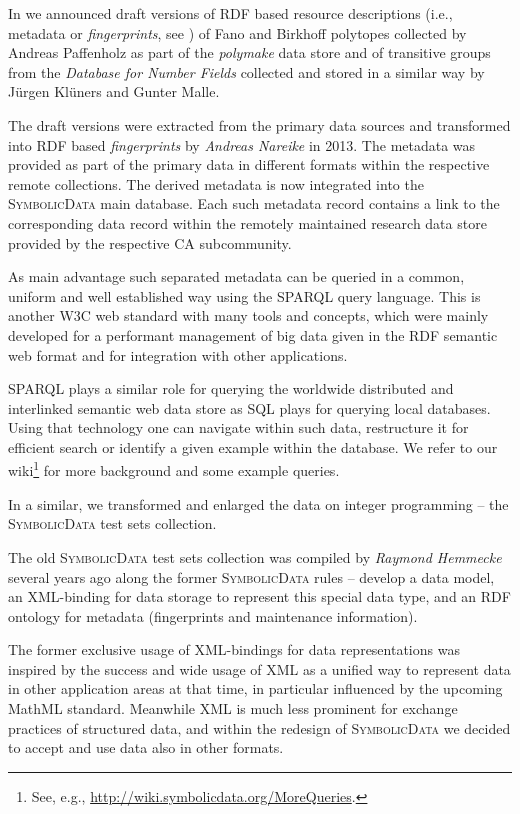 \documentclass[a4paper,11pt]{article}
\def\SD{\textsc{Symbolic\-Data}}
\begin{document}
\begin{multicols}{2}

In \cite{cicm-14} we announced draft versions of RDF based resource
descriptions (i.e., metadata or \emph{fingerprints}, see \cite{icms-16}) of
Fano and Birkhoff polytopes collected by Andreas Paffenholz as part of the
\emph{polymake} data store and of transitive groups from the \emph{Database
  for Number Fields} collected and stored in a similar way by J\"urgen
Kl\"uners and Gunter Malle.

The draft versions were extracted from the primary data sources and
transformed into RDF based \emph{fingerprints} by \emph{Andreas Nareike} in
2013.  The metadata was provided as part of the primary data in different
formats within the respective remote collections. The derived metadata is now
integrated into the {\SD} main database. Each such metadata record contains a
link to the corresponding data record within the remotely maintained research
data store provided by the respective CA subcommunity.

As main advantage such separated metadata can be queried in a common, uniform
and well established way using the SPARQL query language. This is another W3C
web standard with many tools and concepts, which were mainly developed for a
performant management of big data given in the RDF semantic web format and for
integration with other applications.

SPARQL plays a similar role for querying the worldwide distributed and
interlinked semantic web data store as SQL plays for querying local databases.
Using that technology one can navigate within such data, restructure it for
efficient search or identify a given example within the database.  We refer to
our wiki\footnote{See, e.g., \url{http://wiki.symbolicdata.org/MoreQueries}.}
for more background and some example queries.


In a similar, we transformed and enlarged the data on integer programming --
the {\SD} test sets collection. 

The old {\SD} test sets collection was compiled by \emph{Raymond Hemmecke}
several years ago along the former {\SD} rules -- develop a data model, an
XML-binding for data storage to represent this special data type, and an RDF
ontology for metadata (fingerprints and maintenance information).

The former exclusive usage of XML-bindings for data representations was
inspired by the success and wide usage of XML as a unified way to represent
data in other application areas at that time, in particular influenced by the
upcoming MathML standard.  Meanwhile XML is much less prominent for exchange
practices of structured data, and within the redesign of {\SD} we decided to
accept and use data also in other formats.


\end{multicols}
\end{document}
